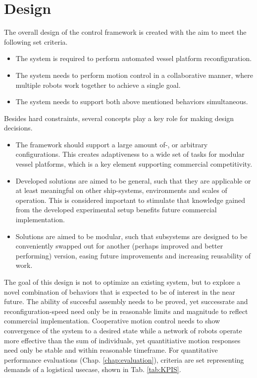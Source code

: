 \section{Design}
\label{sysdesign:Architecture}
The overall design of the control framework is created with the aim to meet the following set criteria.
\begin{itemize}
\item  The system is required to perform automated vessel platform reconfiguration.
\item  The system needs to perform motion control in a collaborative manner, where multiple robots work together to achieve a single goal. 
\item  The system needs to support both above mentioned behaviors simultaneous.
\end{itemize}
Besides hard constraints, several concepts play a key role for making design decisions. 
\begin{itemize}
	\item The framework should support a large amount of-, or arbitrary  configurations.  This creates adaptiveness to a wide set of tasks for modular vessel platforms, which is a key element supporting commercial competitivity.
	\item  Developed solutions are aimed to be general, such that they are applicable or at least meaningful on other ship-systems, environments and scales of operation. This is considered important to stimulate that knowledge gained from the developed experimental setup benefits future commercial implementation.
	\item Solutions are aimed to be modular, such that subsystems are designed to be conveniently swapped out for another (perhaps improved and better performing) version, easing future improvements and increasing reusability of work.
\end{itemize}

The goal of this design is not to optimize an existing system, but to explore a novel combination of behaviors that is expected to be of interest in the near future. 
The ability of succesful assembly needs to be proved, yet successrate and reconfiguration-speed need only be in reasonable limits and magnitude to reflect commercial implementation. Cooperative motion control needs to show convergence of the system to a desired state while a network of robots operate more effective than the sum of individuals, yet quantitiative motion responses need only be stable and within reasonable timeframe. For quantitative performance evaluations (Chap. \ref{chap:evaluation}), criteria are set representing demands of a logistical usecase, shown in Tab. \ref{tab:KPIS}. 

